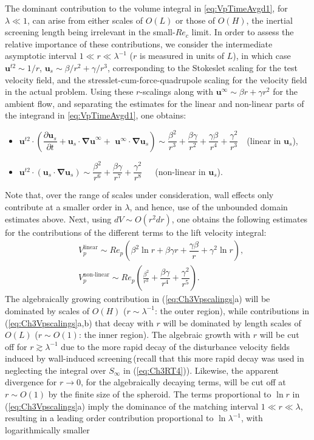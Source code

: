 \documentclass{jfm}
\begin{document}
The dominant contribution to the volume integral in \eqref{eq:VpTimeAvgd1}, for $\lambda\ll1$, can arise from either scales of $O(L)$ or those of $O(H)$, the inertial screening length being irrelevant in the small-$Re_c$ limit. In order to assess the relative importance of these contributions, we consider the intermediate asymptotic interval $1\ll r\ll\lambda^{-1}$ ($r$ is measured in units of $L$), in which case $\bm{u}^{t2}\sim 1/r$, $\bm{u}_s\sim \beta/r^2+\gamma/r^3$, corresponding to the Stokeslet scaling for the test velocity field, and the stresslet-cum-force-quadrupole scaling for the velocity field in the actual problem. Using these $r$-scalings along with $\bm{u}^\infty\sim \beta r + \gamma r^2$ for the ambient flow, and separating the estimates for the linear and non-linear parts of the integrand in \eqref{eq:VpTimeAvgd1}, one obtains:
\begin{itemize}
	\item $\bm{u}^{t2}\cdot\left(\dfrac{\partial\bm{u}_s}{\partial t}+ \bm{u}_s\cdot\bm{\nabla u}^\infty+\,\,\bm{u}^\infty\cdot\bm{\nabla u}_s\right)\sim \dfrac{\beta^2}{r^3}+\dfrac{\beta\gamma}{r^2}+\dfrac{\gamma\beta}{r^4}+\dfrac{\gamma^2}{r^3}\,\,\,\,$ (linear in $\bm{u}_s$),
	\item $\bm{u}^{t2}\cdot(\bm{u}_s\cdot\bm{\nabla} \bm{u}_s)\sim \dfrac{\beta^2}{r^6}+\dfrac{\beta\gamma}{r^7}+\dfrac{\gamma^2}{r^8}\,\,\,\,\,\,\,$ (non-linear in $\bm{u}_s$).
\end{itemize}
Note that, over the range of scales under consideration, wall effects only contribute at a smaller order in $\lambda$, and hence, use of the unbounded domain estimates above. Next, using $dV\sim O(r^2 dr)$, one obtains the following estimates for the contributions of the different terms to the lift velocity integral:
\begin{subequations}
\begin{align}
&V_p^\text{linear}\sim Re_p\left(\beta^2\ln r+\beta\gamma r+\dfrac{\gamma\beta}{r}+\gamma^2\ln r\right), \\
&V_p^\text{non-linear}\sim Re_p\left(\frac{\beta^2}{r^3}+\dfrac{\beta\gamma}{r^4}+\dfrac{\gamma^2}{r^5}\right).
\end{align}  \label{eq:Ch3Vpscalings}
\end{subequations}
The algebraically growing contribution in (\ref{eq:Ch3Vpscalings}a) will be dominated by scales of $O(H)$ ($r\sim\lambda^{-1}$: the outer region), while contributions in (\ref{eq:Ch3Vpscalings}a,b) that decay with $r$ will be dominated by length scales of $O(L)$ ($r\sim O(1)$: the inner region). The algebraic growth with $r$ will be cut off for $r\gtrsim\lambda^{-1}$ due to the more rapid decay of the disturbance velocity fields induced by wall-induced screening\,(recall that this more rapid decay was used in neglecting the integral over $S_\infty$ in (\ref{eq:Ch3RT4})). Likewise, the apparent divergence for $r\to0$, for the algebraically decaying terms, will be cut off at $r \sim O(1)$ by the finite size of the spheroid. The terms proportional to $\ln r$ in (\ref{eq:Ch3Vpscalings}a) imply the dominance of the matching interval $1 \ll r \ll \lambda$, resulting in a leading order contribution proportional to $\ln \lambda^{-1}$, with logarithmically smaller 
\end{document}
